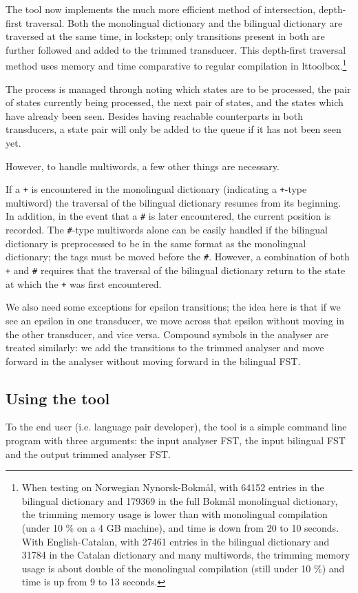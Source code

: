 \documentclass[10pt, a4paper]{article}
\newcommand{\ana}[1]{\texttt{#1}}
\begin{document}
The tool now implements the much more efficient method of
intersection, depth-first traversal. Both the monolingual dictionary
and the bilingual dictionary are traversed at the same time, in
lockstep; only transitions present in both are further followed and
added to the trimmed transducer. This depth-first traversal method
uses memory and time comparative to regular compilation in
lttoolbox.\footnote{When testing on Norwegian Nynorsk-Bokmål, with
  64152 entries in the bilingual dictionary and 179369 in the full
  Bokmål monolingual dictionary, the trimming memory usage is lower
  than with monolingual compilation (under 10 \% on a 4 GB machine),
  and time is down from 20 to 10 seconds. With English-Catalan, with
  27461 entries in the bilingual dictionary and 31784 in the Catalan
  dictionary and many multiwords, the trimming memory usage is about
  double of the monolingual compilation (still under 10 \%) and time
  is up from 9 to 13 seconds.}

The process is managed through noting which states are to be
processed, the pair of states currently being processed, the next pair
of states, and the states which have already been seen. Besides having
reachable counterparts in both transducers, a state pair will only be
added to the queue if it has not been seen yet.

However, to handle multiwords, a few other things are necessary.

If a \ana{+} is encountered in the monolingual dictionary (indicating
a \ana{+}-type multiword) the traversal of the bilingual dictionary
resumes from its beginning. In addition, in the event that a \ana{\#}
is later encountered, the current position is recorded. The
\ana{\#}-type multiwords alone can be easily handled if the bilingual
dictionary is preprocessed to be in the same format as the monolingual
dictionary; the tags must be moved before the \ana{\#}.  However, a
combination of both \ana{+} and \ana{\#} requires that the traversal of the
bilingual dictionary return to the state at which the \ana{+} was
first encountered.

We also need some exceptions for epsilon transitions; the idea here is
that if we see an epsilon in one transducer, we move across that
epsilon without moving in the other transducer, and vice versa.
Compound symbols in the analyser are treated similarly: we add the
transitions to the trimmed analyser and move forward in the analyser
without moving forward in the bilingual FST.

\subsection{Using the tool}
To the end user (i.e. language pair developer), the tool is a simple
command line program with three arguments: the input analyser FST, the
input bilingual FST and the output trimmed analyser FST. 
\end{document}
